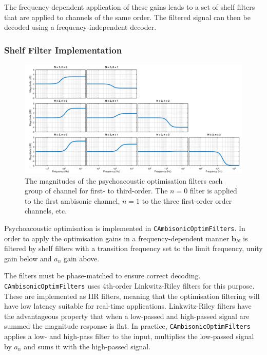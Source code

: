 \documentclass[12pt]{report}
\newcommand{\code}[1]{\texttt{#1}}
\begin{document}
The frequency-dependent application of these gains leads to a set of shelf filters that are applied to channels of the same order.
The filtered signal can then be decoded using a frequency-independent decoder.

\subsubsection{Shelf Filter Implementation}

\begin{figure}
    \centering
    \includegraphics[width = \textwidth]{figures/shelf_filters.png}
    \caption{The magnitudes of the psychoacoustic optimisation filters each group of channel for first- to third-order. The $n = 0$ filter is applied to the first ambisonic channel, $n = 1$ to the three first-order order channels, etc.}
    \label{fig:shelf_filters}
\end{figure}

Psychoacoustic optimisation is implemented in \code{CAmbisonicOptimFilters}.
In order to apply the optimisation gains in a frequency-dependent manner $\textbf{b}_{N}$ is filtered by shelf filters with a transition frequency set to the limit frequency, unity gain below and $a_{n}$ gain above.

The filters must be phase-matched to ensure correct decoding.
\code{CAmbisonicOptimFilters} uses 4th-order Linkwitz-Riley filters for this purpose.
These are implemented as IIR filters, meaning that the optimisation filtering will have low latency suitable for real-time applications.
Linkwitz-Riley filters have the advantageous property that when a low-passed and high-passed signal are summed the magnitude response is flat.
In practice, \code{CAmbisonicOptimFilters} applies a low- and high-pass filter to the input, multiplies the low-passed signal by $a_{n}$ and sums it with the high-passed signal.
\end{document}
